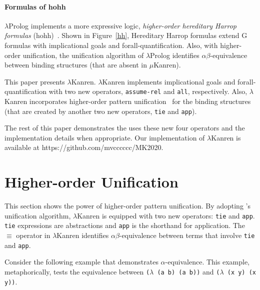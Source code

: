 \documentclass[acmlarge,review]{acmart}
\theoremstyle{definition}
\begin{document}
\paragraph{Formulas of hohh}
$\lambda$Prolog implements a more expressive logic, \emph{higher-order
  hereditary Harrop formulas} (hohh)~\citep{miller_hereditary_1987}.
Shown in Figure~\ref{hh}, Hereditary Harrop formulas extend G formulas
with implicational goals and forall-quantification. Also, with higher-order
unification, the unification algorithm of $\lambda$Prolog identifies
$\alpha\beta$-equivalence between binding structures
(that are absent in $\mu$Kanren).

This paper presents $\lambda$Kanren.
$\lambda$Kanren implements implicational goals and forall-quantification with
two new operators, \texttt{assume-rel} and \texttt{all}, respectively.
Also, $\lambda$Kanren incorporates higher-order pattern
unification~\citep{miller_logic_1991} for the binding structures
(that are created by another two new operators, \texttt{tie} and \texttt{app}).


The rest of this paper demonstrates the uses these new four operators
and the implementation details when appropriate.
Our implementation of $\lambda$Kanren is available at
https://github.com/mvcccccc/MK2020.

\section{Higher-order Unification}
This section shows the power of higher-order pattern unification.
By adopting \citet{miller_logic_1991}'s unification algorithm, $\lambda$Kanren
is equipped with two new operators: \texttt{tie} and \texttt{app}.
\texttt{tie} expressions are abstractions and \texttt{app} is the
shorthand for application.
The $\equiv$ operator in $\lambda$Kanren identifies
$\alpha\beta$-equivalence between terms that involve
\texttt{tie} and \texttt{app}.

Consider the following example that demonstrates $\alpha$-equivalence.
This example, metaphorically, tests the equivalence between
\texttt{($\lambda$ (a b) (a b))} and \texttt{($\lambda$ (x y) (x y))}.
\end{document}
